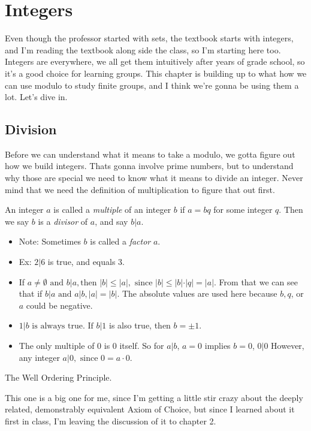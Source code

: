 \chapter{Integers}

Even though the professor started with sets, the textbook starts with integers,
and I'm reading the textbook along side the class, so I'm starting here too.
Integers are everywhere, we all get them intuitively after years of grade
school, so it's a good choice for learning groups. This chapter is building up
to what how we can use modulo to study finite groups, and I think we're gonna be
using them a lot. Let's dive in.
\section{Division}

Before we can understand what it means to take a modulo, we gotta figure out how we build integers. Thats gonna involve prime numbers, but to understand why those are special we need to know what it means to divide an integer. Never mind that we need the definition of multiplication to figure that out first.

 An integer \(a\) is called a \emph{multiple} of an integer \(b\) if \(a = bq\) for some integer \(q\). Then we say \(b\) is a \emph{divisor} of \(a\), and say \(b|a\).

\begin{itemize}
    \item Note: Sometimes \(b\) is called a \emph{factor} \(a\).
    \item Ex: \(2|6\) is true, and equals 3.
    \item If \(a \neq \emptyset  \text{ and } b|a,\text{then } |b| \leq |a|, \text{ since } |b| \leq |b| \cdot |q| = |a|\). From that we can see that if \(b|a \text{ and } a|b, |a| = |b|\). The absolute values are used here because \(b, q\), or \(a\) could be negative.

    \item \(1|b \text{ is always true. If } b|1\) is also true, then \(b = \pm 1\).
    \item The only multiple of 0 is 0 itself. So for \(a|b\), \(a = 0\) implies \(b = 0\), \(0|0\) However, any integer \(a|0, \text{ since } 0 = a \cdot 0\).
\end{itemize}

 The Well Ordering Principle.

This one is a big one for me, since I'm getting a little stir crazy about the deeply related, demonstrably equivalent Axiom of Choice, but since I learned about it first in class, I'm leaving the discussion of it to chapter 2.

